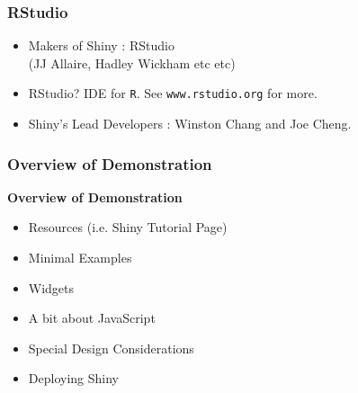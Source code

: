 \documentclass{beamer}
\begin{document}
\begin{frame}
\frametitle{RStudio}
\LARGE
\begin{itemize}
\item Makers of Shiny : RStudio\\ (JJ Allaire, Hadley Wickham etc etc)
\item RStudio? IDE for \texttt{R}. See \texttt{www.rstudio.org} for more.
\item Shiny's  Lead Developers : Winston Chang and Joe Cheng.
\end{itemize}

\end{frame}
\begin{frame}
\frametitle{Overview of Demonstration}
\Large
\textbf{Overview of Demonstration}
\begin{itemize}
\item Resources (i.e. Shiny Tutorial Page)
\item Minimal Examples 
\item Widgets
\item A bit about JavaScript
\item Special Design Considerations
\item Deploying Shiny
\end{itemize}
\end{frame}
%
%
%
\end{document}
